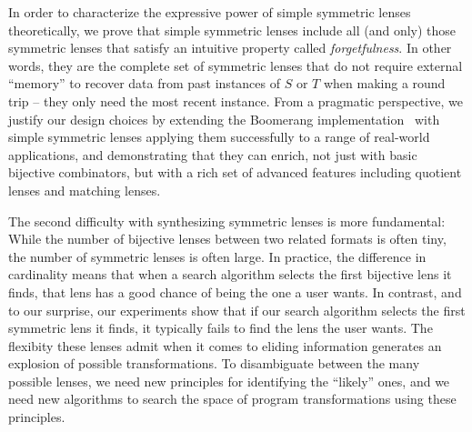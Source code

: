 \documentclass[acmsmall,screen,anonymous]{acmart}
\begin{document}
In order to characterize the expressive power of simple symmetric lenses
theoretically, we prove that simple symmetric lenses include all (and only)
those symmetric lenses that satisfy an intuitive property called
\emph{forgetfulness}. In other words, they are the complete set of symmetric
lenses that do not require external ``memory'' to recover data from past
instances of $S$ or $T$ when making a round trip -- they only need the most
recent instance. From a pragmatic perspective, we justify our design choices by
extending the Boomerang implementation~\cite{Boomerang} with simple symmetric
lenses applying them successfully to a range of real-world applications, and
demonstrating that they can enrich, not just with basic bijective combinators,
but with a rich set of advanced features including quotient lenses and matching
lenses.

The second difficulty with synthesizing symmetric lenses is more
fundamental: While the number of bijective lenses between two
related formats is often tiny, the number of symmetric lenses is often large. In
practice, the difference in cardinality means that when a search algorithm
selects the first bijective lens it finds, that lens has a good chance of being
the one a user wants. In contrast, and to our surprise, our experiments show
that if our search algorithm selects the first symmetric lens it finds, it
typically fails to find the lens the user wants. The flexibity these lenses
admit when it comes to eliding information generates an explosion of possible
transformations. To disambiguate between the many possible lenses, we need new
principles for identifying the ``likely'' ones, and we need new algorithms to
search the space of program transformations using these principles.
\end{document}
